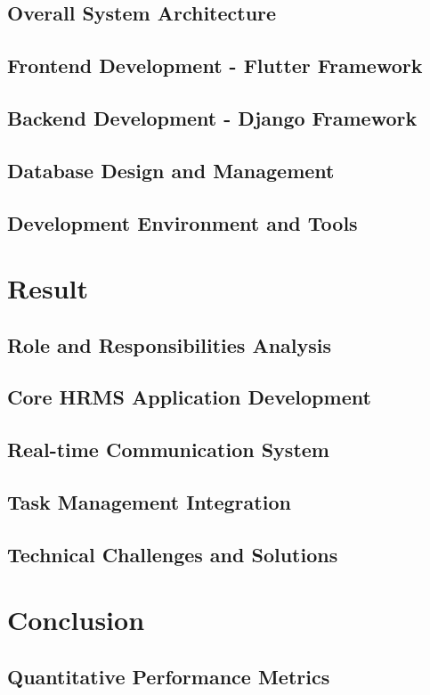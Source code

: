 \documentclass[a4paper, 11pt, oneside]{report}
\begin{document}
  \section{Overall System Architecture}
  \section{Frontend Development - Flutter Framework}
  \section{Backend Development - Django Framework}
  \section{Database Design and Management}
  \section{Development Environment and Tools}
  

\chapter{Result}
  \section{Role and Responsibilities Analysis}
  \section{Core HRMS Application Development}
  \section{Real-time Communication System}
  \section{Task Management Integration}
  \section{Technical Challenges and Solutions}
  

\chapter{Conclusion}
  \section{Quantitative Performance Metrics}
\end{document}
